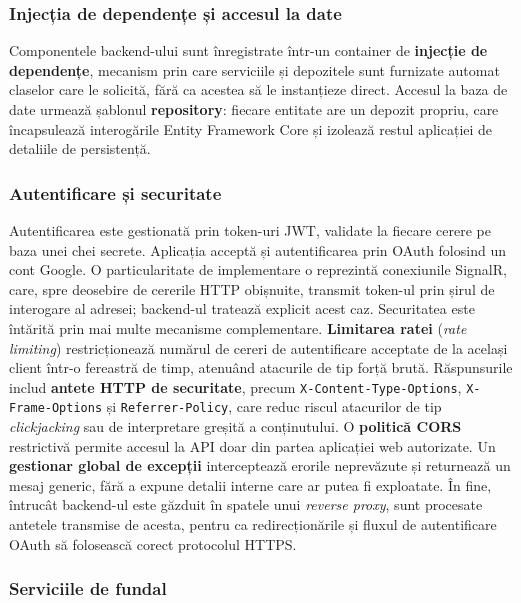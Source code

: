 \documentclass[12pt,a4paper]{article}
\begin{document}
\subsubsection{Injecția de dependențe și accesul la date}

Componentele backend-ului sunt înregistrate într-un container de \textbf{injecție de dependențe}, mecanism prin care serviciile și depozitele sunt furnizate automat claselor care le solicită, fără ca acestea să le instanțieze direct. Accesul la baza de date urmează șablonul \textbf{repository}: fiecare entitate are un depozit propriu, care încapsulează interogările Entity Framework Core și izolează restul aplicației de detaliile de persistență.

\subsubsection{Autentificare și securitate}

Autentificarea este gestionată prin token-uri JWT, validate la fiecare cerere pe baza unei chei secrete. Aplicația acceptă și autentificarea prin OAuth folosind un cont Google. O particularitate de implementare o reprezintă conexiunile SignalR, care, spre deosebire de cererile HTTP obișnuite, transmit token-ul prin șirul de interogare al adresei; backend-ul tratează explicit acest caz. Securitatea este întărită prin mai multe mecanisme complementare. \textbf{Limitarea ratei} (\textit{rate limiting}) restricționează numărul de cereri de autentificare acceptate de la același client într-o fereastră de timp, atenuând atacurile de tip forță brută. Răspunsurile includ \textbf{antete HTTP de securitate}, precum \texttt{X-Content-Type-Options}, \texttt{X-Frame-Options} și \texttt{Referrer-Policy}, care reduc riscul atacurilor de tip \textit{clickjacking} sau de interpretare greșită a conținutului. O \textbf{politică CORS} restrictivă permite accesul la API doar din partea aplicației web autorizate. Un \textbf{gestionar global de excepții} interceptează erorile neprevăzute și returnează un mesaj generic, fără a expune detalii interne care ar putea fi exploatate. În fine, întrucât backend-ul este găzduit în spatele unui \textit{reverse proxy}, sunt procesate antetele transmise de acesta, pentru ca redirecționările și fluxul de autentificare OAuth să folosească corect protocolul HTTPS.

\subsubsection{Serviciile de fundal}
\end{document}
